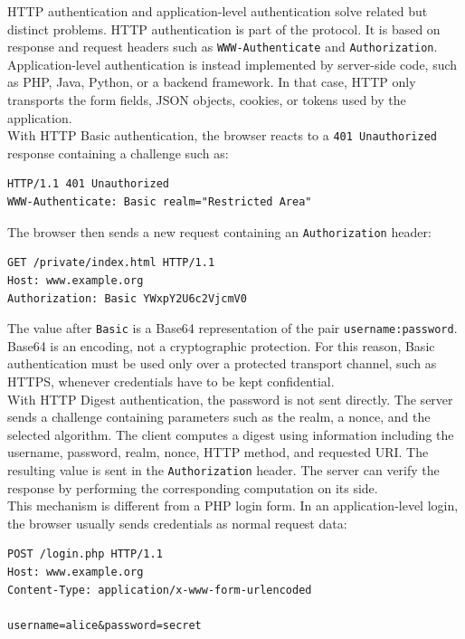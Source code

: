 \documentclass{scrbook}
\begin{document}
HTTP authentication and application-level authentication solve related but distinct problems. HTTP authentication is part of the protocol. It is based on response and request headers such as \texttt{WWW-Authenticate} and \texttt{Authorization}. Application-level authentication is instead implemented by server-side code, such as PHP, Java, Python, or a backend framework. In that case, HTTP only transports the form fields, JSON objects, cookies, or tokens used by the application.\\

With HTTP Basic authentication, the browser reacts to a \texttt{401 Unauthorized} response containing a challenge such as:

\begin{lstlisting}
HTTP/1.1 401 Unauthorized
WWW-Authenticate: Basic realm="Restricted Area"
\end{lstlisting}

The browser then sends a new request containing an \texttt{Authorization} header:

\begin{lstlisting}
GET /private/index.html HTTP/1.1
Host: www.example.org
Authorization: Basic YWxpY2U6c2VjcmV0
\end{lstlisting}

The value after \texttt{Basic} is a Base64 representation of the pair \texttt{username:password}. Base64 is an encoding, not a cryptographic protection. For this reason, Basic authentication must be used only over a protected transport channel, such as HTTPS, whenever credentials have to be kept confidential.\\

With HTTP Digest authentication, the password is not sent directly. The server sends a challenge containing parameters such as the realm, a nonce, and the selected algorithm. The client computes a digest using information including the username, password, realm, nonce, HTTP method, and requested URI. The resulting value is sent in the \texttt{Authorization} header. The server can verify the response by performing the corresponding computation on its side.\\

This mechanism is different from a PHP login form. In an application-level login, the browser usually sends credentials as normal request data:

\begin{lstlisting}
POST /login.php HTTP/1.1
Host: www.example.org
Content-Type: application/x-www-form-urlencoded

username=alice&password=secret
\end{lstlisting}
\end{document}
